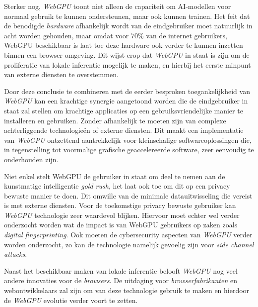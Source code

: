 \bigbreak{}

Sterker nog, \textit{WebGPU} toont niet alleen de capaciteit om  AI-modellen voor normaal gebruik te kunnen ondersteunen, maar ook kunnen trainen. Het feit dat de benodigde \textit{hardware} afhankelijk wordt van de eindgebruiker moet natuurlijk in acht worden gehouden, maar omdat voor 70\% van de internet gebruikers, WebGPU beschikbaar is laat toe deze hardware ook verder te kunnen inzetten binnen een browser omgeving. Dit wijst erop dat \textit{WebGPU} in staat is zijn om de proliferatie van lokale inferentie mogelijk te maken, en hierbij het eerste minpunt van externe diensten te overstemmen.

\bigbreak{}

Door deze conclusie te combineren met de eerder besproken toegankelijkheid van \textit{WebGPU} kan een krachtige synergie aangetoond worden die de eindgebruiker in staat zal stellen om krachtige applicaties op een gebruiksvriendelijke manier te installeren en gebruiken. Zonder afhankelijk te moeten zijn van complexe achterliggende technologieën of externe diensten. Dit maakt een implementatie van \textit{WebGPU} ontzettend aantrekkelijk voor kleinschalige softwareoplossingen die, in tegenstelling tot voormalige grafische geaccelereerde software, zeer eenvoudig te onderhouden zijn.


\bigbreak{}

Niet enkel stelt WebGPU de gebruiker in staat om deel te nemen aan de kunstmatige intelligentie \textit{gold rush}, het laat ook toe om dit op een privacy bewuste manier te doen. Dit omwille van de minimale datauitwisseling die vereist is met externe diensten. Voor de toekomstige privacy bewuste gebruiker kan \textit{WebGPU} technologie zeer waardevol blijken. Hiervoor moet echter wel verder onderzocht worden wat de impact is van WebGPU gebruikers op zaken zoals \textit{digital fingerprinting}. Ook moeten de cybersecurity aspecten van \textit{WebGPU} verder worden onderzocht, zo kan de technologie namelijk gevoelig zijn voor \textit{side channel attacks}.

\bigbreak{}

Naast het beschikbaar maken van lokale inferentie belooft \textit{WebGPU} nog veel andere innovaties voor de \textit{browsers}. De uitdaging voor \textit{browserfabrikanten} en webontwikkelaars zal zijn om van deze technologie gebruik te maken en hierdoor de \textit{WebGPU} evolutie verder voort te zetten.